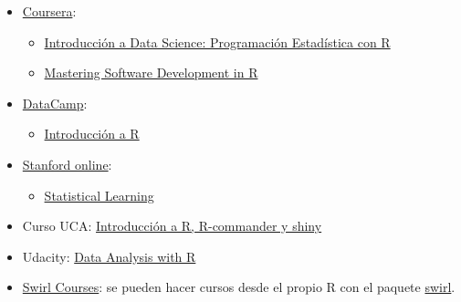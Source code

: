 \documentclass[
]{book}
\providecommand{\tightlist}{%
  \setlength{\itemsep}{0pt}\setlength{\parskip}{0pt}}
\theoremstyle{break}
\begin{document}
\begin{itemize}
\item
  \href{https://www.coursera.org/}{Coursera}:

  \begin{itemize}
  \item
    \href{https://www.coursera.org/learn/intro-data-science-programacion-estadistica-r}{Introducción a Data Science: Programación Estadística con R}
  \item
    \href{https://www.coursera.org/specializations/r}{Mastering Software Development in R}
  \end{itemize}
\end{itemize}

\begin{itemize}
\item
  \href{https://www.datacamp.com/courses}{DataCamp}:

  \begin{itemize}
  \tightlist
  \item
    \href{https://www.datacamp.com/courses/introduccion-a-r/}{Introducción a R}
  \end{itemize}
\end{itemize}

\begin{itemize}
\item
  \href{http://online.stanford.edu/courses}{Stanford online}:

  \begin{itemize}
  \tightlist
  \item
    \href{http://online.stanford.edu/course/statistical-learning}{Statistical Learning}
  \end{itemize}
\end{itemize}

\begin{itemize}
\tightlist
\item
  Curso UCA: \href{http://knuth.uca.es/moodle/course/view.php?id=51}{Introducción a R, R-commander y shiny}
\end{itemize}

\begin{itemize}
\tightlist
\item
  Udacity: \href{https://eu.udacity.com/course/data-analysis-with-r--ud651}{Data Analysis with R}
\end{itemize}

\begin{itemize}
\tightlist
\item
  \href{https://swirlstats.com/scn/title.html}{Swirl Courses}:
  se pueden hacer cursos desde el propio R con el paquete
  \href{https://swirlstats.com}{swirl}.
\end{itemize}
\end{document}
